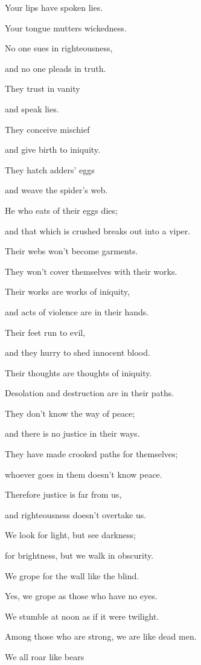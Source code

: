 Your lips have spoken lies.

Your tongue mutters wickedness.

\myverse{}No one sues in righteousness,

and no one pleads in truth.

They trust in vanity

and speak lies.

They conceive mischief

and give birth to iniquity.

\myverse{}They hatch adders’ eggs

and weave the spider’s web.

He who eats of their eggs dies;

and that which is crushed breaks out into a viper.

\myverse{}Their webs won’t become garments.

They won’t cover themselves with their works.

Their works are works of iniquity,

and acts of violence are in their hands.

\myverse{}Their feet run to evil,

and they hurry to shed innocent blood.

Their thoughts are thoughts of iniquity.

Desolation and destruction are in their paths.

\myverse{}They don’t know the way of peace;

and there is no justice in their ways.

They have made crooked paths for themselves;

whoever goes in them doesn’t know peace.


\vspace{\baselineskip} \myverse{}Therefore justice is far from us,

and righteousness doesn’t overtake us.

We look for light, but see darkness;

for brightness, but we walk in obscurity.

\myverse{}We grope for the wall like the blind.

Yes, we grope as those who have no eyes.

We stumble at noon as if it were twilight.

Among those who are strong, we are like dead men.

\myverse{}We all roar like bears


